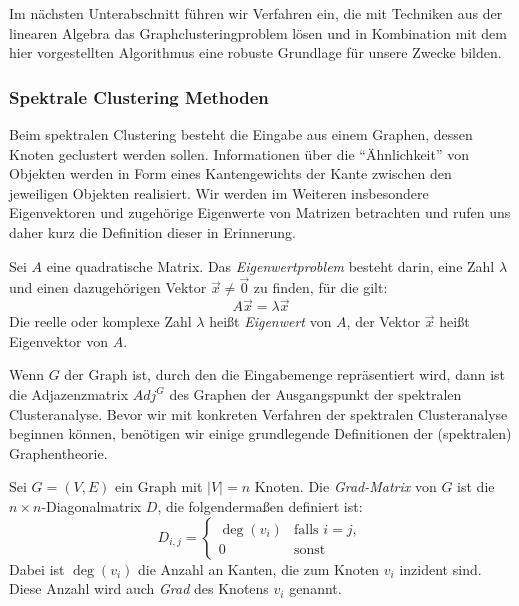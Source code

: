 Im nächsten Unterabschnitt führen wir Verfahren ein, die mit Techniken aus der linearen Algebra das Graphclusteringproblem
lösen und in Kombination mit dem hier vorgestellten Algorithmus eine robuste Grundlage für unsere Zwecke bilden.

\subsubsection{Spektrale Clustering Methoden}

Beim spektralen Clustering besteht die Eingabe aus einem Graphen, dessen Knoten geclustert werden sollen. Informationen
über die "`Ähnlichkeit"' von Objekten werden in Form eines Kantengewichts der Kante zwischen den jeweiligen Objekten
realisiert. Wir werden im Weiteren insbesondere Eigenvektoren und zugehörige Eigenwerte von Matrizen betrachten und rufen uns
daher kurz die Definition dieser in Erinnerung.

\begin{definition}
\label{def:eigenvector-eigenvalue}
	Sei $A$ eine quadratische Matrix. Das \emph{Eigenwertproblem} besteht darin, eine Zahl $\lambda$ und einen
	dazugehörigen Vektor $\vec{x} \neq \vec{0}$ zu finden, für die gilt:
	\[ A \vec{x} = \lambda \vec{x} \]
	Die reelle oder komplexe Zahl $\lambda$ heißt \emph{Eigenwert} von $A$, der Vektor $\vec{x}$ heißt Eigenvektor von $A$.
\end{definition}

Wenn $G$ der Graph ist, durch den die Eingabemenge repräsentiert wird, dann ist die Adjazenzmatrix $Adj^G$ des
Graphen der Ausgangspunkt der spektralen Clusteranalyse. Bevor wir mit konkreten Verfahren der spektralen Clusteranalyse
beginnen können, benötigen wir einige grundlegende Definitionen der (spektralen) Graphentheorie.

\begin{definition}
\label{def:degree-matrix}
	Sei $G = (V,E)$ ein Graph mit $\left| V \right| = n$ Knoten. Die \emph{Grad-Matrix} von $G$ ist die
	$n \times n$-Diagonalmatrix $D$, die folgendermaßen definiert ist:
	\[ D_{i,j} = 	\begin{cases}
						\deg(v_i) & \textrm{falls } i = j, \\
						0 & \textrm{sonst}
					\end{cases}
	\]
	Dabei ist $\deg(v_i)$ die Anzahl an Kanten, die zum Knoten $v_i$ inzident sind. Diese Anzahl wird auch
	\emph{Grad} des Knotens $v_i$ genannt.
\end{definition}

